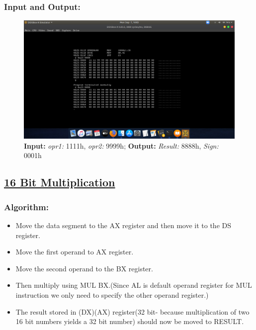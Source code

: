 \documentclass[12pt,a4paper]{article}
\begin{document}
\begin{flushleft}
\subsubsection*{\textbf{Input and Output:}}
\begin{figure}[h]
    \centering
    \includegraphics[trim = 100mm 60mm 100mm 80mm, clip, width = \textwidth]{Pics/SubtractionIO.png}
    \caption{ \textbf{Input:} \emph{opr1:} 1111h, \emph{opr2:} 9999h; 
              \textbf{Output:} \emph{Result:} 8888h, \emph{Sign:} 0001h}
\end{figure}

\newpage
\subsection*{\textbf{\underline{16 Bit Multiplication}}}

\subsubsection*{\textbf{Algorithm:}}
\begin{itemize}
    \item Move the data segment to the AX register and then move it to the DS register.
    \item Move the first operand to AX register.
    \item  Move the second operand to the BX register.
    \item  Then multiply using MUL BX.(Since AL is default operand register for MUL instruction we only need to specify the other operand register.)
    \item  The result stored in (DX)(AX) register(32 bit- because multiplication of two 16 bit numbers yields a 32 bit number) should now be moved to RESULT.
\end{itemize}


\end{flushleft}
\end{document}
